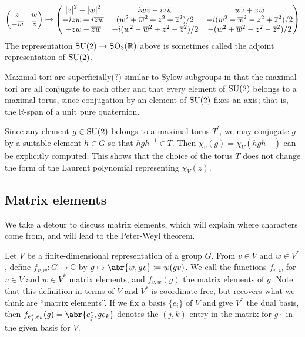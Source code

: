 \documentclass[../../rtnotes.tex]{subfiles}
\begin{document}
\[\begin{pmatrix}
    z & w \\
    -\overline w & \overline z
\end{pmatrix}\mapsto \begin{pmatrix}
    \abs{z}^2-\abs{w}^2 & iw\overline z-iz\overline w & w\overline z + z\overline w\\
    -izw+i\overline z\overline w & (w^2+\overline w^2 + z^2+\overline z^2)/2 & -i(w^2-\overline w^2-z^2+\overline z^2)/2\\
-zw-\overline z\overline w & -i(w^2-\overline w^2+z^2-\overline z^2)/2 & -(w^2+\overline w^2-z^2-\overline z^2)/2\end{pmatrix}\]
The representation $\operatorname{SU}(2)\to \operatorname{SO}_3(\mathbb R)$ above is sometimes called the adjoint representation of $\operatorname{SU}(2)$.

Maximal tori are superficially(?) similar to Sylow subgroups in that the maximal tori are all conjugate to each other and that every element of $\operatorname{SU}(2)$ belongs to a maximal torus, since conjugation by an element of $\operatorname{SU}(2)$ fixes an axis; that is, the $\mathbb R$-span of a unit pure quaternion.

Since any element $g\in \operatorname{SU}(2)$ belongs to a maximal torus $T^\prime$, we may conjugate $g$ by a suitable element $h\in G$ so that $hgh^{-1}\in T$. Then $\chi_v(g) = \chi_V(hgh^{-1})$ can be explicitly computed. This shows that the choice of the torus $T$ does not change the form of the Laurent polynomial representing $\chi_V(z)$.

\subsection{Matrix elements}
We take a detour to discuss matrix elements, which will explain where characters come from, and will lead to the Peter-Weyl theorem.

Let $V$ be a finite-dimensional representation of a group $G$. From $v\in V$ and $w\in V^\ast$, define $f_{v,w}\colon G\to \mathbb C$ by $g\mapsto \abr{w,gv}\coloneqq w(gv)$. We call the functions $f_{v,w}$ for $v\in V$ and $w\in V^\ast$ matrix elements, and $f_{v,w}(g)$ the matrix elements of $g$. Note that this definition in terms of $V$ and $V^\ast$ is coordinate-free, but recovers what we think are ``matrix elements''. If we fix a basis $\{e_i\}$ of $V$ and give $V^\ast$ the dual basis, then $f_{e_j^\ast,e_k}(g) = \abr{e_j^\ast,ge_k}$ denotes the $(j,k)$-entry in the matrix for $g\cdot$ in the given basis for $V$. 
\end{document}
